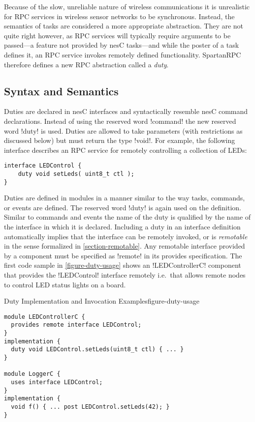 Because of the slow, unreliable nature of wireless communications it is unrealistic for RPC
services in wireless sensor networks to be synchronous. Instead, the semantics of tasks are
considered a more appropriate abstraction. They are not quite right however, as RPC services
will typically require arguments to be passed---a feature not provided by nesC tasks---and while
the poster of a task defines it, an RPC service invokes remotely defined functionality.
SpartanRPC therefore defines a new RPC abstraction called a \emph{duty}.

\subsection{Syntax and Semantics}
\label{section-duties-syntax}

Duties are declared in nesC interfaces and syntactically resemble nesC command declarations.
Instead of using the reserved word !command! the new reserved word !duty! is used. Duties are
allowed to take parameters (with restrictions as discussed below) but must return the type
!void!. For example, the following interface describes an RPC service for remotely controlling a
collection of LEDs:

\singlespace
\begin{lstlisting}
interface LEDControl {
    duty void setLeds( uint8_t ctl );
}
\end{lstlisting}
\primaryspacing

Duties are defined in modules in a manner similar to the way tasks, commands, or events are
defined. The reserved word !duty! is again used on the definition. Similar to commands and events the
name of the duty is qualified by the name of the interface in which it is declared. Including a
duty in an interface definition automatically implies that the interface can be remotely
invoked, or is \emph{remotable} in the sense formalized in \autoref{section-remotable}. Any
remotable interface provided by a component must be specified as !remote! in its provides
specification. The first code sample in \autoref{figure-duty-usage} shows an !LEDControllerC!
component that provides the !LEDControl! interface remotely i.e.~that allows remote nodes to
control LED status lights on a board.

\begin{fpfig}[t]{Duty Implementation and Invocation Examples}{figure-duty-usage}
{
\singlespace
\begin{lstlisting}
module LEDControllerC {
  provides remote interface LEDControl;
}
implementation {
  duty void LEDControl.setLeds(uint8_t ctl) { ... }
} 
 
module LoggerC {
  uses interface LEDControl;
}
implementation {
  void f() { ... post LEDControl.setLeds(42); }
}
\end{lstlisting}
\primaryspacing
}
\end{fpfig}

